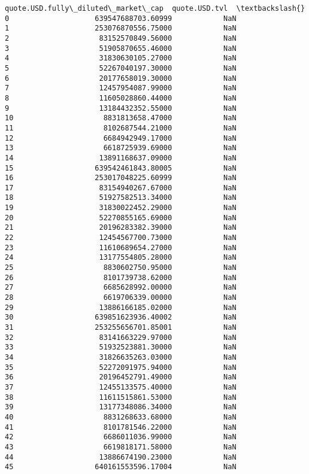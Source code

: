\documentclass[11pt]{article}
\begin{document}
\begin{tcolorbox}[breakable, size=fbox, boxrule=.5pt, pad at break*=1mm, opacityfill=0]
\begin{Verbatim}[commandchars=\\\{\}]
     quote.USD.fully\_diluted\_market\_cap  quote.USD.tvl  \textbackslash{}
0                    639547688703.60999            NaN
1                    253076870556.75000            NaN
2                     83152570849.56000            NaN
3                     51905870655.46000            NaN
4                     31830630105.27000            NaN
5                     52267040197.30000            NaN
6                     20177658019.30000            NaN
7                     12457954087.99000            NaN
8                     11605028860.44000            NaN
9                     13184432352.55000            NaN
10                     8831813658.47000            NaN
11                     8102687544.21000            NaN
12                     6684942949.17000            NaN
13                     6618725939.69000            NaN
14                    13891168637.09000            NaN
15                   639542461843.80005            NaN
16                   253017048225.60999            NaN
17                    83154940267.67000            NaN
18                    51927582513.34000            NaN
19                    31830022452.29000            NaN
20                    52270855165.69000            NaN
21                    20196283382.39000            NaN
22                    12454567700.73000            NaN
23                    11610689654.27000            NaN
24                    13177554805.28000            NaN
25                     8830602750.95000            NaN
26                     8101739738.62000            NaN
27                     6685628992.00000            NaN
28                     6619706339.00000            NaN
29                    13886166185.02000            NaN
30                   639851623936.40002            NaN
31                   253255656701.85001            NaN
32                    83141663229.97000            NaN
33                    51932523881.30000            NaN
34                    31826635263.03000            NaN
35                    52272091975.94000            NaN
36                    20196452791.49000            NaN
37                    12455133575.40000            NaN
38                    11611515861.53000            NaN
39                    13177348086.34000            NaN
40                     8831268633.68000            NaN
41                     8101781546.22000            NaN
42                     6686011036.99000            NaN
43                     6619818171.58000            NaN
44                    13886674190.23000            NaN
45                   640161553596.17004            NaN

\end{Verbatim}
\end{tcolorbox}
\end{document}
